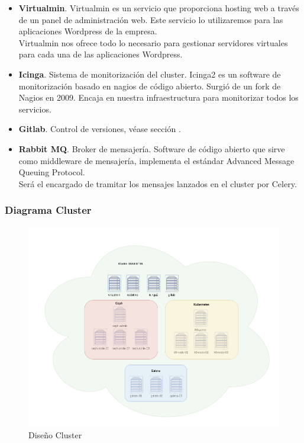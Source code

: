 \begin{text}
\begin{itemize}
                                \item \textbf{Virtualmin}. Virtualmin \cite{virtualmin:online} es un servicio que proporciona hosting web a través de un panel de administración web. Este servicio lo utilizaremos para las aplicaciones Wordpress de la empresa. \\
                                Virtualmin nos ofrece todo lo necesario para gestionar servidores virtuales para cada una de las aplicaciones Wordpress. 
                                \item \textbf{Icinga}. Sistema de monitorización del cluster. Icinga2 es un software de monitorización basado en nagios de código abierto. Surgió de un fork de Nagios en 2009. Encaja en nuestra infraestructura para monitorizar todos los servicios.
                                \item \textbf{Gitlab}. Control de versiones, véase sección .
                                \item \textbf{Rabbit MQ}. Broker de mensajería. Software de código abierto que sirve como middleware de mensajería, implementa el estándar Advanced Message Queuing Protocol. \\ 
                                Será el encargado de tramitar los mensajes lanzados en el cluster por Celery. 
                        \end{itemize}
                \clearpage
                \subsubsection{Diagrama Cluster}
                        \begin{figure}[!hbt]
                                \centering
                                \includegraphics[scale=0.39]{imagenes/Diseno/diagrama_cluster_2.png}
                                \caption[Diseño Cluster]{Diseño Cluster} 
                                \label{cluster_design}
                        \end{figure}

        \end{text}

